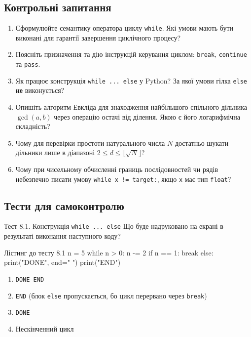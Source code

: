 \subsection*{Контрольні запитання}
\begin{enumerate}[label=\textbf{8.\arabic*.}]
	\item Сформулюйте семантику оператора циклу \texttt{while}. Які умови мають бути виконані для гарантії завершення циклічного процесу?
	\item Поясніть призначення та дію інструкцій керування циклом: \texttt{break}, \texttt{continue} та \texttt{pass}.
	\item Як працює конструкція \texttt{while ... else} у Python? За якої умови гілка \texttt{else} \textbf{не} виконується?
	\item Опишіть алгоритм Евкліда для знаходження найбільшого спільного дільника $\gcd(a, b)$ через операцію остачі від ділення. Якою є його логарифмічна складність?
	\item Чому для перевірки простоти натурального числа $N$ достатньо шукати дільники лише в діапазоні $2 \le d \le \lfloor\sqrt{N}\rfloor$?
	\item Чому при чисельному обчисленні границь послідовностей чи рядів небезпечно писати умову \texttt{while x != target:}, якщо \texttt{x} має тип \texttt{float}?
\end{enumerate}

\subsection*{Тести для самоконтролю}

\begin{pr}{Тест 8.1. Конструкція \texttt{while ... else}}
Що буде надруковано на екрані в результаті виконання наступного коду?
\begin{py}{Лістинг до тесту 8.1}
n = 5
while n > 0:
    n -= 2
    if n == 1:
        break
else:
    print("DONE", end=" ")
print("END")
\end{py}
\begin{enumerate}[label=\textbf{\Alph*.}]
	\item \texttt{DONE END}
	\item \texttt{END} (блок \texttt{else} пропускається, бо цикл перервано через \texttt{break})
	\item \texttt{DONE}
	\item Нескінченний цикл
\end{enumerate}
\end{pr}

